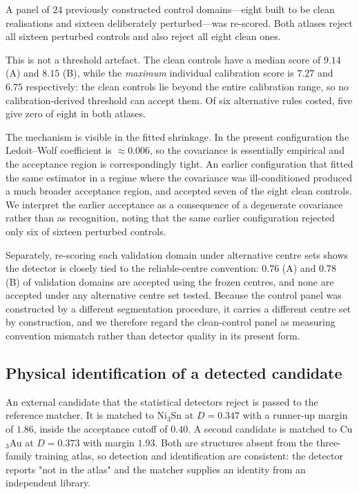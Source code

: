 A panel of $24$ previously constructed control domains---eight built to be clean
realisations and sixteen deliberately perturbed---was re-scored. Both atlases reject all
sixteen perturbed controls and also reject all eight clean ones.

This is not a threshold artefact. The clean controls have a median score of $9.14$ (A) and
$8.15$ (B), while the \emph{maximum} individual calibration score is $7.27$ and $6.75$
respectively: the clean controls lie beyond the entire calibration range, so no
calibration-derived threshold can accept them. Of six alternative rules costed, five give
zero of eight in both atlases.

The mechanism is visible in the fitted shrinkage. In the present configuration the
Ledoit--Wolf coefficient is $\approx 0.006$, so the covariance is essentially empirical and
the acceptance region is correspondingly tight. An earlier configuration that fitted the
same estimator in a regime where the covariance was ill-conditioned produced a much broader
acceptance region, and accepted seven of the eight clean controls. We interpret the earlier
acceptance as a consequence of a degenerate covariance rather than as recognition, noting
that the same earlier configuration rejected only six of sixteen perturbed controls.

Separately, re-scoring each validation domain under alternative centre sets shows the
detector is closely tied to the reliable-centre convention: $0.76$ (A) and $0.78$ (B) of
validation domains are accepted using the frozen centres, and none are accepted under any
alternative centre set tested. Because the control panel was constructed by a different
segmentation procedure, it carries a different centre set by construction, and we therefore
regard the clean-control panel as measuring convention mismatch rather than detector
quality in its present form.

\subsection{Physical identification of a detected candidate}
\label{sec:res-matcher}

An external candidate that the statistical detectors reject is passed to the reference
matcher. It is matched to Ni$_3$Sn at $D = 0.347$ with a runner-up margin of $1.86$, inside
the acceptance cutoff of $0.40$. A second candidate is matched to Cu$_3$Au at $D = 0.373$
with margin $1.93$. Both are structures absent from the three-family training atlas, so
detection and identification are consistent: the detector reports "not in the atlas" and the
matcher supplies an identity from an independent library.

